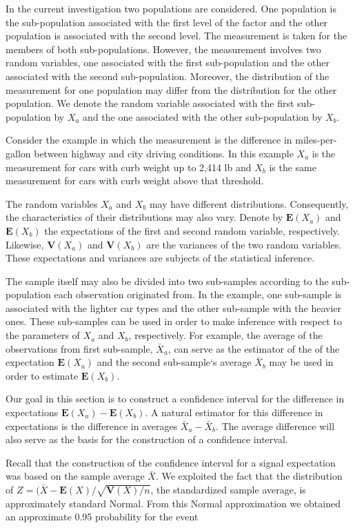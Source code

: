 \documentclass[]{krantz}
\newcommand{\Expec}{\mathbf{E}}
\newcommand{\Var}{\mathbf{V}}
\theoremstyle{definition}
\theoremstyle{definition}
\theoremstyle{definition}
\theoremstyle{remark}
\begin{document}
In the current investigation two populations are considered. One
population is the sub-population associated with the first level of the
factor and the other population is associated with the second level. The
measurement is taken for the members of both sub-populations. However,
the measurement involves two random variables, one associated with the
first sub-population and the other associated with the second
sub-population. Moreover, the distribution of the measurement for one
population may differ from the distribution for the other population. We
denote the random variable associated with the first sub-population by
\(X_a\) and the one associated with the other sub-population by \(X_b\).

Consider the example in which the measurement is the difference in
miles-per-gallon between highway and city driving conditions. In this
example \(X_a\) is the measurement for cars with curb weight up to 2,414
lb and \(X_b\) is the same measurement for cars with curb weight above
that threshold.

The random variables \(X_a\) and \(X_b\) may have different distributions.
Consequently, the characteristics of their distributions may also vary.
Denote by \(\Expec(X_a)\) and \(\Expec(X_b)\) the expectations of the first
and second random variable, respectively. Likewise, \(\Var(X_a)\) and
\(\Var(X_b)\) are the variances of the two random variables. These
expectations and variances are subjects of the statistical inference.

The sample itself may also be divided into two sub-samples according to
the sub-population each observation originated from. In the example, one
sub-sample is associated with the lighter car types and the other
sub-sample with the heavier ones. These sub-samples can be used in order
to make inference with respect to the parameters of \(X_a\) and \(X_b\),
respectively. For example, the average of the observations from first
sub-sample, \(\bar X_a\), can serve as the estimator of the of the
expectation \(\Expec(X_a)\) and the second sub-sample`s average \(\bar X_b\)
may be used in order to estimate \(\Expec(X_b)\).

Our goal in this section is to construct a confidence interval for the
difference in expectations \(\Expec(X_a)-\Expec(X_b)\). A natural
estimator for this difference in expectations is the difference in
averages \(\bar X_a- \bar X_b\). The average difference will also serve as
the basis for the construction of a confidence interval.

Recall that the construction of the confidence interval for a signal
expectation was based on the sample average \(\bar X\). We exploited the
fact that the distribution of
\(Z = (\bar X - \Expec(X)/\sqrt{\Var(X)/n}\), the standardized sample
average, is approximately standard Normal. From this Normal
approximation we obtained an approximate 0.95 probability for the event
\end{document}
